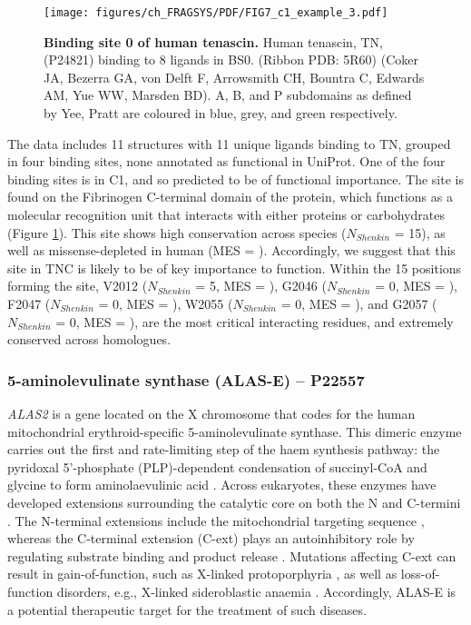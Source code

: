 \begin{figure}[h]
    \centering
    \texttt{[image: figures/ch\_FRAGSYS/PDF/FIG7\_c1\_example\_3.pdf]}
    \caption[Binding site 0 of human tenascin]{\textbf{Binding site 0 of human tenascin.} Human tenascin, TN, (P24821) binding to 8 ligands in BS0. (Ribbon PDB: 5R60) (Coker JA, Bezerra GA, von Delft F, Arrowsmith CH, Bountra C, Edwards AM, Yue WW, Marsden BD). A, B, and P subdomains as defined by Yee, Pratt \cite{YEE_1997_FIBRINOGEN} are coloured in blue, grey, and green respectively.}
    \label{fig:c1_example_3}
\end{figure}

The data includes 11 structures with 11 unique ligands binding to TN, grouped in four binding sites, none annotated as functional in UniProt. One of the four binding sites is in C1, and so predicted to be of functional importance. The site is found on the Fibrinogen C-terminal domain of the protein, which functions as a molecular recognition unit that interacts with either proteins or carbohydrates (Figure \ref{fig:c1_example_3}). This site shows high conservation across species ($N_{Shenkin}$ = 15), as well as missense-depleted in human (MES = ). Accordingly, we suggest that this site in TNC is likely to be of key importance to function. Within the 15 positions forming the site, V2012 ($N_{Shenkin}$ = 5, MES = ), G2046 ($N_{Shenkin}$ = 0, MES = ), F2047 ($N_{Shenkin}$ = 0, MES = ), W2055 ($N_{Shenkin}$ = 0, MES = ), and G2057 ($N_{Shenkin}$ = 0, MES = ), are the most critical interacting residues, and extremely conserved across homologues.

\subsubsection{5-aminolevulinate synthase (ALAS-E) -- P22557}

\textit{ALAS2} is a gene located on the X chromosome that codes for the human mitochondrial erythroid-specific 5-aminolevulinate synthase. This dimeric enzyme carries out the first and rate-limiting step of the haem synthesis pathway: the pyridoxal 5’-phosphate (PLP)-dependent condensation of succinyl-CoA and glycine to form aminolaevulinic acid \cite{AKHTAR_1976_PORPHYRIN}. Across eukaryotes, these enzymes have developed extensions surrounding the catalytic core on both the N and C-termini \cite{MUNAKATA_1993_AMINOLEVULINATE}. The N-terminal extensions include the mitochondrial targeting sequence \cite{SRIVASTAVA_1988_AMINOLEVULINATE}, whereas the C-terminal extension (C-ext) plays an autoinhibitory role by regulating substrate binding and product release \cite{BAILEY_2020_AMINOLEVULINATE}. Mutations affecting C-ext can result in gain-of-function, such as X-linked protoporphyria \cite{WHATLEY_2008_AMINOLEVULINATE}, as well as loss-of-function disorders, e.g., X-linked sideroblastic anaemia \cite{DUCAMP_2011_SIDEROBLASTIC}. Accordingly, ALAS-E is a potential therapeutic target for the treatment of such diseases.

